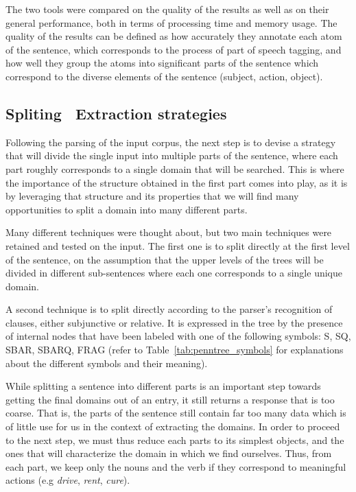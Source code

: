 The two tools were compared on the quality of the results as well as on their general performance, both in terms of processing time and memory usage. The quality of the results can be defined as how accurately they annotate each atom of the sentence, which corresponds to the process of part of speech tagging, and how well they group the atoms into significant parts of the sentence which correspond to the diverse elements of the sentence (subject, action, object).


\subsection{Spliting \amper\ Extraction strategies} %
\label{sub:extraction_strategies}

Following the parsing of the input corpus, the next step is to devise a strategy that will divide the single input into multiple parts of the sentence, where each part roughly corresponds to a single domain that will be searched. This is where the importance of the structure obtained in the first part comes into play, as it is by leveraging that structure and its properties that we will find many opportunities to split a domain into many different parts.

Many different techniques were thought about, but two main techniques were retained and tested on the input. The first one is to split directly at the first level of the sentence, on the assumption that the upper levels of the trees will be divided in different sub-sentences where each one corresponds to a single unique domain.

A second technique is to split directly according to the parser's recognition of clauses, either subjunctive or relative. It is expressed in the tree by the presence of internal nodes that have been labeled with one of the following symbols: S, SQ, SBAR, SBARQ, FRAG (refer to Table~\ref{tab:penntree_symbols} for explanations about the different symbols and their meaning).

While splitting a sentence into different parts is an important step towards getting the final domains out of an entry, it still returns a response that is too coarse. That is, the parts of the sentence still contain far too many data which is of little use for us in the context of extracting the domains. In order to proceed to the next step, we must thus reduce each parts to its simplest objects, and the ones that will characterize the domain in which we find ourselves. Thus, from each part, we keep only the nouns and the verb if they correspond to meaningful actions (e.g \emph{drive}, \emph{rent}, \emph{cure}).

